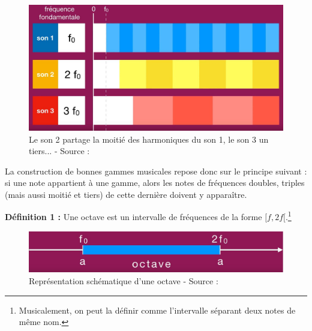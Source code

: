 \documentclass[moyen]{classeUPD}
\newenvironment{definition}{
	\begin{lrbox}{\tempbox}
		\begin{minipage}{\textwidth}
		}{
		\end{minipage}
	\end{lrbox}
	\begin{center}
		\fcolorbox[HTML]{222222}{EEEEEE}{
			\usebox{\tempbox}
		}
	\end{center}
}
\newcommand{\emf}[1]{\textbf{#1}}
\begin{document}
\begin{figure}[h!]
	\begin{center}
		\includegraphics[width=0.6\textheight]{Notes2}
		\caption[Harmoniques et fondamentales...]{Le son 2 partage la moitié des harmoniques du son 1, le son 3 un tiers... - Source : \cite{cordierphychi_fractions_nodate}}
		\label{figure 1}
	\end{center}
\end{figure}

La construction de bonnes gammes musicales repose donc sur le principe suivant : si une note appartient à une gamme, alors les notes de fréquences doubles, triples (mais aussi moitié et tiers) de cette dernière doivent y apparaître.

\begin{definition}
	\emf{Définition 1 :} Une octave est un intervalle de fréquences de la forme $[f,2f[$.\footnote{Musicalement, on peut la définir comme l’intervalle séparant deux notes de même nom.}\\
\end{definition}

\begin{figure}[h!]
	\begin{center}
		\includegraphics[width=0.6\textheight]{Octave}
		\caption[Schématisation octave]{Représentation schématique d'une octave - Source : \cite{cordierphychi_fractions_nodate}}
		\label{figure 2}
	\end{center}
\end{figure}
\end{document}
